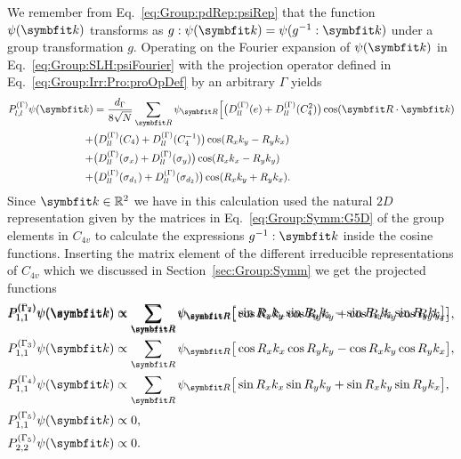 We remember from Eq.~\eqref{eq:Group:pdRep:psiRep} that the function $\psi(\v{k})$ transforms as $g:\psi(\v{k}) = \psi(g^{-1}:\v{k})$ under a group
transformation $g$. Operating on the Fourier expansion of $\psi(\v{k})$ in Eq.~\eqref{eq:Group:SLH:psiFourier} with the projection operator
defined in Eq.~\eqref{eq:Group:Irr:Pro:proOpDef} by an arbitrary \irr $\Gamma$ yields
\begin{equation}
    \label{eq:Group:SLH:even:Ppsi}
    \begin{split}
        P_{l,l}^{(\Gamma)}\psi(\v{k}) &= \frac{d_\Gamma}{8\sqrt{N}}\sum_\v{R}\psi_\v{R}\Big[\big(D_{ll}^{(\Gamma)}(e)+D_{ll}^{(\Gamma)}(C_4^2)\big)\cos(\v{R}\cdot\v{k})\\
        + & \big(D_{ll}^{(\Gamma)}(C_4) + D_{ll}^{(\Gamma)}(C_4^{-1})\big)\cos(R_xk_y-R_yk_x)\\
        + & \big(D_{ll}^{(\Gamma)}(\sigma_x) + D_{ll}^{(\Gamma)}(\sigma_y)\big)\cos(R_xk_x-R_yk_y)\\
        + & \big(D_{ll}^{(\Gamma)}(\sigma_{d_1}) + D_{ll}^{(\Gamma)}(\sigma_{d_2})\big)\cos(R_xk_y+R_yk_x).
    \end{split}
\end{equation}
Since $\v{k}\in\mathbb{R}^2$ we have in this calculation used the natural $2D$ representation given by the matrices in Eq.~\eqref{eq:Group:Symm:G5D}
of the group elements in $C_{4v}$ to calculate the expressions $g^{-1}:\v{k}$ inside the cosine functions. Inserting the matrix element of the different
irreducible representations of $C_{4v}$ which we discussed in Section~\ref{sec:Group:Symm} we get the projected functions 
\begin{subequations}
    \label{eq:Group:SLH:even:projections}
    \begin{align}
        \label{eq:Group:SLH:even:projections:G1}%
        P_{1,1}^{(\Gamma_1)}\psi(\v{k}) &\propto \sum_\v{R}\psi_\v{R}\big[\cos R_xk_x\cos R_yk_y + \cos R_xk_y\cos R_yk_x\big],\\[-30pt]
        \label{eq:Group:SLH:even:projections:G2}%
        P_{1,1}^{(\Gamma_2)}\psi(\v{k}) &\propto \sum_\v{R}\psi_\v{R}\big[\sin R_xk_y\sin R_yk_x - \sin R_xk_x\sin R_yk_y\big],\\
        \label{eq:Group:SLH:even:projections:G3}%
        P_{1,1}^{(\Gamma_3)}\psi(\v{k}) &\propto \sum_\v{R}\psi_\v{R}\big[\cos R_xk_x\cos R_yk_y - \cos R_xk_y\cos R_yk_x\big],\\
        \label{eq:Group:SLH:even:projections:G4}%
        P_{1,1}^{(\Gamma_4)}\psi(\v{k}) &\propto \sum_\v{R}\psi_\v{R}\big[\sin R_xk_x\sin R_yk_y + \sin R_xk_y\sin R_yk_x\big],\\
        \label{eq:Group:SLH:even:projections:G51}%
        P_{1,1}^{(\Gamma_5)}\psi(\v{k}) &\propto 0,\\
        \label{eq:Group:SLH:even:projections:G52}%
        P_{2,2}^{(\Gamma_5)}\psi(\v{k}) &\propto 0.
    \end{align}
\end{subequations}

